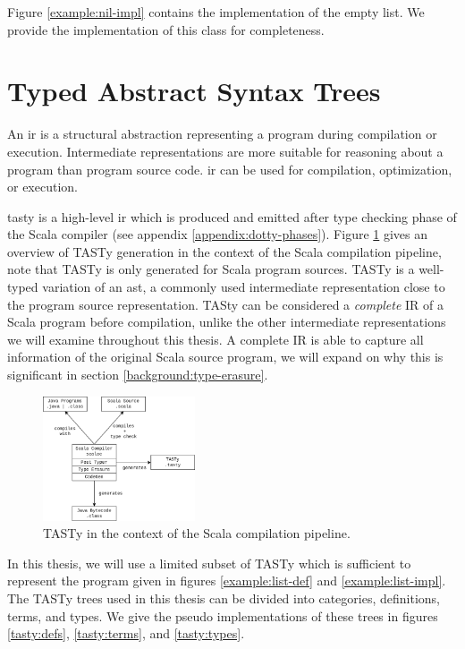 Figure \ref{example:nil-impl} contains the implementation of the empty list. 
We provide the implementation of this class for completeness.


\section{Typed Abstract Syntax Trees}

An \acrfull{ir} is a structural abstraction representing a program during compilation or execution. 
Intermediate representations are more suitable for reasoning about a program than program source code. 
\acrshort{ir} can be used for compilation\cite{llvm}, optimization\cite{llvm}\cite{ssa}, or execution\cite{java:vm-spec}\cite{clr:spec}.

\acrfull{tasty} is a high-level \acrfull{ir} which is produced and emitted after type checking phase of the Scala compiler (see appendix \ref{appendix:dotty-phases}).
Figure \ref{system:tasty} gives an overview of TASTy generation in the context of the Scala compilation pipeline, note that TASTy is only generated for Scala program sources.
TASTy is a well-typed variation of an \acrfull{ast}, a commonly used intermediate representation close to the program source representation.
TASty can be considered a \textit{complete} IR of a Scala program before compilation, unlike the other intermediate representations we will examine throughout this thesis.
A complete IR is able to capture all information of the original Scala source program, we will expand on why this is significant in section \ref{background:type-erasure}.

\begin{figure}[H]
	\centering
	\includegraphics[width=0.4\textwidth]{figures/scala-pipeline.png}
	\caption{TASTy in the context of the Scala compilation pipeline.}
	\label{system:tasty}
\end{figure}

In this thesis, we will use a limited subset of TASTy which is sufficient to represent the program given in figures \ref{example:list-def} and \ref{example:list-impl}.
The TASTy trees used in this thesis can be divided into categories, definitions, terms, and types. 
We give the pseudo implementations of these trees in figures \ref{tasty:defs}, \ref{tasty:terms}, and \ref{tasty:types}.

